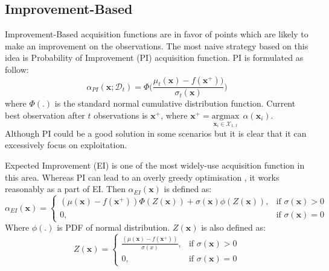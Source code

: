 \subsection{Improvement-Based}
Improvement-Based acquisition functions are in favor of points which are likely to make an improvement on the observations.
The most naive strategy based on this idea is Probability of Improvement (PI) acquisition function. PI‌ is formulated as follow:
\begin{equation}
\alpha_{PI} (\textbf{x};\mathcal{D}_t) = \Phi \Big(\frac{\mu_t(\textbf{x}) - f(\textbf{x}^+))}{\sigma_{t}(\textbf{x})} \Big)
\label{eq:pi}
\end{equation}
where $\Phi(.)$ is the standard normal cumulative distribution function. Current best observation after $t$ observations is $\textbf{x}^+$, where $\textbf{x}^+ = \underset{\textbf{x}_i \in \mathcal{X}_{1..t}}{\mathrm{argmax}}\ \ \alpha(\textbf{x}_i)$. Although PI could be a good solution in some scenarios but it is clear that it can excessively focus on exploitation. 
\par
Expected Improvement (EI) is one of the most widely-use acquisition function in this area. 
Whereas PI can lead to an overly greedy optimisation \cite{shahriari2016taking}, it works reasonably as a part of EI.
Then $\alpha_{EI}(\textbf{x})$ is defined as:
\begin{equation}
\alpha_{EI}(\textbf{x}) = 
\begin{cases}
 (\mu(\textbf{x}) - f(\textbf{x}^+))\Phi(Z(\textbf{x})) + \sigma(\textbf{x})\phi(Z(\textbf{x})) ,& \text{if } \sigma(\textbf{x}) > 0\\
    0,              & \text{if } \sigma(\textbf{x}) = 0
\end{cases}
\end{equation}
Where $\phi(.)$ is PDF of normal distribution. $Z(\textbf{x})$ is also defined as:
\begin{equation}
Z(\textbf{x}) = 
\begin{cases}
 \frac{(\mu(\textbf{x}) - f(\textbf{x}^+))}{\sigma(x)} ,& \text{if } \sigma(\textbf{x}) > 0\\
    0,              & \text{if } \sigma(\textbf{x}) = 0
\end{cases}
\end{equation}

